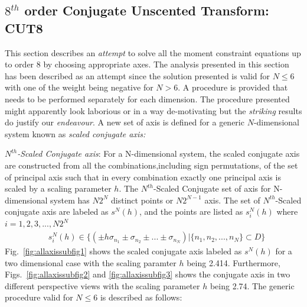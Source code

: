 \documentclass[letterpaper, 10 pt, conference]{IEEEtran}  %
\begin{document}
\subsection{$8^{th}$ order Conjugate Unscented Transform: CUT8}
This section describes an  \emph{attempt} to solve all the moment constraint equations up to order 8 by choosing appropriate axes. The analysis presented in this section has been described as an attempt since the solution presented is valid for $N \le 6$ with one of the weight being negative for $N>6$. A procedure is provided that needs to be performed separately for each dimension. The procedure presented might apparently look laborious or in a way de-motivating but the \emph{striking} results do justify our \emph{endeavour}. A new set of axis is defined for a generic $N$-dimensional system known as \textit{scaled conjugate axis:}

\emph{$N^{th}$-Scaled Conjugate axis}: For a N-dimensional system, the scaled conjugate axis are constructed from all the combinations,including sign permutations, of the set of principal axis such that in every combination exactly one principal axis is scaled by a scaling parameter $h$. The $N^{th}$-Scaled Conjugate set of axis for N-dimensional system has $N2^N$ distinct points or $N2^{N-1}$ axis. The set of $N^{th}$-Scaled conjugate axis are labeled as $s^N(h)$, and the points are listed as $s^N_i(h)$ where $i=1,2,3,...,N2^N$ 
\begin{align}
&s^N_i(h) \in \{(\pm h\sigma_{n_1}\pm\sigma_{n_2} \pm ...\pm \sigma_{n_N})|\{n_1,n_2,...,n_N\}\subset D\} 
\end{align}
Fig.~\ref{fig:allaxissubfig1} shows the scaled conjugate axis labeled as $s^N(h)$ for a two dimensional case with the scaling paramter $h$ being 2.414. Furthermore, Figs.~\ref{fig:allaxissubfig2} and \ref{fig:allaxissubfig3} shows the conjugate axis in two different perspective views with the scaling parameter $h$ being 2.74. The generic procedure valid for $N\le 6$ is described as follows:
\end{document}
